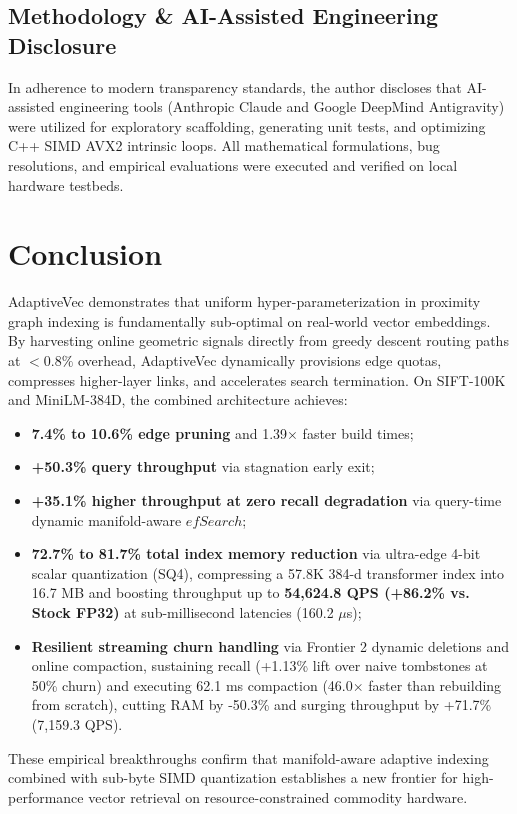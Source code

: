 \documentclass[conference,10pt]{IEEEtran}
\begin{document}
\subsection{Methodology \& AI-Assisted Engineering Disclosure}
In adherence to modern transparency standards, the author discloses that AI-assisted engineering tools (Anthropic Claude and Google DeepMind Antigravity) were utilized for exploratory scaffolding, generating unit tests, and optimizing C++ SIMD AVX2 intrinsic loops. All mathematical formulations, bug resolutions, and empirical evaluations were executed and verified on local hardware testbeds.

\section{Conclusion}
AdaptiveVec demonstrates that uniform hyper-parameterization in proximity graph indexing is fundamentally sub-optimal on real-world vector embeddings. By harvesting online geometric signals directly from greedy descent routing paths at $<0.8\%$ overhead, AdaptiveVec dynamically provisions edge quotas, compresses higher-layer links, and accelerates search termination. On SIFT-100K and MiniLM-384D, the combined architecture achieves:
\begin{itemize}
    \item \textbf{7.4\% to 10.6\% edge pruning} and 1.39$\times$ faster build times;
    \item \textbf{+50.3\% query throughput} via stagnation early exit;
    \item \textbf{+35.1\% higher throughput at zero recall degradation} via query-time dynamic manifold-aware $efSearch$;
    \item \textbf{72.7\% to 81.7\% total index memory reduction} via ultra-edge 4-bit scalar quantization (SQ4), compressing a 57.8K 384-d transformer index into 16.7 MB and boosting throughput up to \textbf{54,624.8 QPS (+86.2\% vs. Stock FP32)} at sub-millisecond latencies (160.2 $\mu$s);
    \item \textbf{Resilient streaming churn handling} via Frontier 2 dynamic deletions and online compaction, sustaining recall (+1.13\% lift over naive tombstones at 50\% churn) and executing 62.1 ms compaction (46.0$\times$ faster than rebuilding from scratch), cutting RAM by -50.3\% and surging throughput by +71.7\% (7,159.3 QPS).
\end{itemize}
These empirical breakthroughs confirm that manifold-aware adaptive indexing combined with sub-byte SIMD quantization establishes a new frontier for high-performance vector retrieval on resource-constrained commodity hardware.
\end{document}
